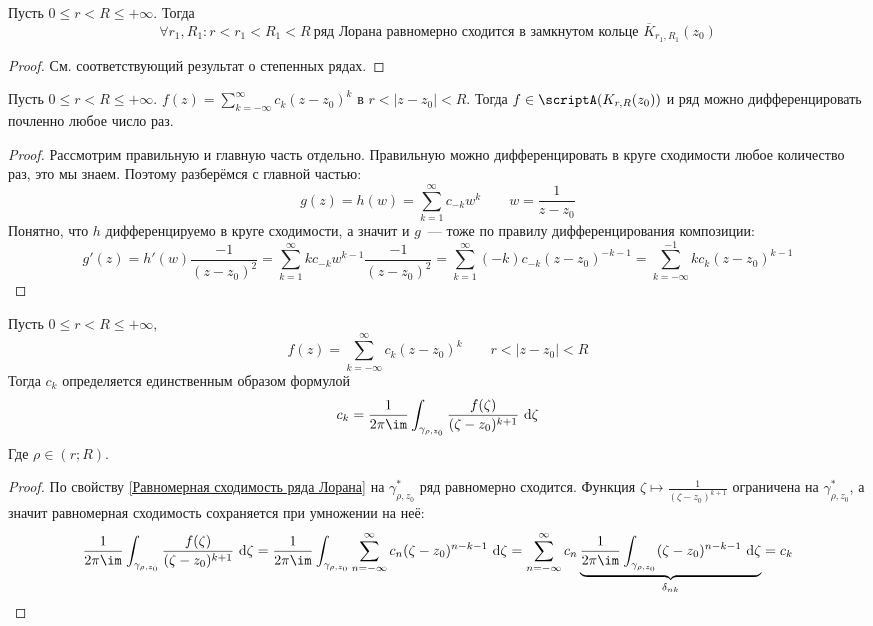 \documentclass{article}
\begin{document}
    \begin{property}
        \label{Равномерная сходимость ряда Лорана}
        Пусть $0\leqslant r<R\leqslant +\infty$. Тогда
        $$
        \forall r_1,R_1:r<r_1<R_1<R~\text{ряд Лорана равномерно сходится в замкнутом кольце }\overline K_{r_1,R_1}(z_0)
        $$
    \end{property}
    \begin{proof}
        См. соответствующий результат о степенных рядах.
    \end{proof}
    \begin{property}
        \label{Дифференцирование рядов Лорана}
        Пусть $0\leqslant r<R\leqslant+\infty$. $f(z)=\sum\limits_{k=-\infty}^\infty c_k(z-z_0)^k$ в $r<|z-z_0|<R$. Тогда $f\in\scriptA(K_{r,R}(z_0))$ и ряд можно дифференцировать почленно любое число раз.
    \end{property}
    \begin{proof}
        Рассмотрим правильную и главную часть отдельно. Правильную можно дифференцировать в круге сходимости любое количество раз, это мы знаем. Поэтому разберёмся с главной частью:
        $$
        g(z)=h(w)=\sum\limits_{k=1}^\infty c_{-k}w^k\qquad w=\frac1{z-z_0}
        $$
        Понятно, что $h$ дифференцируемо в круге сходимости, а значит и $g$~--- тоже по правилу дифференцирования композиции:
        $$
        g'(z)=h'(w)\frac{-1}{(z-z_0)^2}=\sum\limits_{k=1}^\infty kc_{-k}w^{k-1}\frac{-1}{(z-z_0)^2}=\sum\limits_{k=1}^\infty (-k)c_{-k}(z-z_0)^{-k-1}=\sum\limits_{k=-\infty}^{-1}kc_k(z-z_0)^{k-1}
        $$
    \end{proof}
    \begin{property}
        Пусть $0\leqslant r<R\leqslant+\infty$,
        $$
        f(z)=\sum\limits_{k=-\infty}^\infty c_k(z-z_0)^k\qquad r<|z-z_0|<R
        $$
        Тогда $c_k$ определяется единственным образом формулой
        $$
        c_k=\frac1{2\pi\im}\int_{\gamma_{\rho,z_0}}\frac{f(\zeta)}{(\zeta-z_0)^{k+1}}~\mathrm d\zeta
        $$
        Где $\rho\in(r;R)$.
    \end{property}
    \begin{proof}
        По свойству \ref{Равномерная сходимость ряда Лорана} на $\gamma^*_{\rho,z_0}$ ряд равномерно сходится. Функция $\zeta\mapsto\frac1{(\zeta-z_0)^{k+1}}$ ограничена на $\gamma^*_{\rho,z_0}$, а значит равномерная сходимость сохраняется при умножении на неё:
        $$
        \frac1{2\pi\im}\int_{\gamma_{\rho,z_0}}\frac{f(\zeta)}{(\zeta-z_0)^{k+1}}~\mathrm d\zeta=
        \frac1{2\pi\im}\int_{\gamma_{\rho,z_0}}\sum\limits_{n=-\infty}^\infty c_n(\zeta-z_0)^{n-k-1}~\mathrm d\zeta=
        \sum\limits_{n=-\infty}^\infty c_n\underbrace{\frac1{2\pi\im}\int_{\gamma_{\rho,z_0}}(\zeta-z_0)^{n-k-1}~\mathrm d\zeta}_{\delta_{nk}}=c_k
        $$
    \end{proof}
\end{document}

